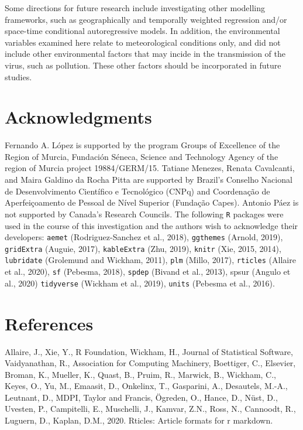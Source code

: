 \documentclass[]{elsarticle} %
\begin{document}
Some directions for future research include investigating other
modelling frameworks, such as geographically and temporally weighted
regression and/or space-time conditional autoregressive models. In
addition, the environmental variables examined here relate to
meteorological conditions only, and did not include other environmental
factors that may incide in the transmission of the virus, such as
pollution. These other factors should be incorporated in future studies.

\hypertarget{acknowledgments}{%
\section*{Acknowledgments}\label{acknowledgments}}

Fernando A. López is supported by the program Groups of Excellence of
the Region of Murcia, Fundación Séneca, Science and Technology Agency of
the region of Murcia project 19884/GERM/15. Tatiane Menezes, Renata
Cavalcanti, and Maira Galdino da Rocha Pitta are supported by Brazil's
Conselho Nacional de Desenvolvimento Científico e Tecnológico (CNPq) and
Coordenação de Aperfeiçoamento de Pessoal de Nível Superior (Fundação
Capes). Antonio Páez is not supported by Canada's Research Councils. The
following \texttt{R} packages were used in the course of this
investigation and the authors wish to acknowledge their developers:
\texttt{aemet} (Rodriguez-Sanchez et al., 2018), \texttt{ggthemes}
(Arnold, 2019), \texttt{gridExtra} (Auguie, 2017), \texttt{kableExtra}
(Zhu, 2019), \texttt{knitr} (Xie, 2015, 2014), \texttt{lubridate}
(Grolemund and Wickham, 2011), \texttt{plm} (Millo, 2017),
\texttt{rticles} (Allaire et al., 2020), \texttt{sf} (Pebesma, 2018),
\texttt{spdep} (Bivand et al., 2013), spsur (Angulo et al., 2020)
\texttt{tidyverse} (Wickham et al., 2019), \texttt{units} (Pebesma et
al., 2016).

\hypertarget{references}{%
\section*{References}\label{references}}

\hypertarget{refs}{}
\leavevmode\hypertarget{ref-Allaire2020}{}%
Allaire, J., Xie, Y., R Foundation, Wickham, H., Journal of Statistical
Software, Vaidyanathan, R., Association for Computing Machinery,
Boettiger, C., Elsevier, Broman, K., Mueller, K., Quast, B., Pruim, R.,
Marwick, B., Wickham, C., Keyes, O., Yu, M., Emaasit, D., Onkelinx, T.,
Gasparini, A., Desautels, M.-A., Leutnant, D., MDPI, Taylor and Francis,
Ögreden, O., Hance, D., Nüst, D., Uvesten, P., Campitelli, E.,
Muschelli, J., Kamvar, Z.N., Ross, N., Cannoodt, R., Luguern, D.,
Kaplan, D.M., 2020. Rticles: Article formats for r markdown.
\end{document}
